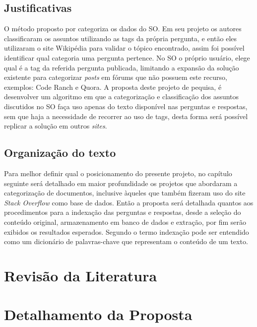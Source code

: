 \documentclass[10pt,a4paper,final]{article}
\begin{document}
    \subsection{Justificativas}

O método proposto por \cite{Arash2016} categoriza os dados do SO. Em seu projeto os autores classificaram os assuntos utilizando as tags da própria pergunta, e então eles utilizaram o site Wikipédia para validar o tópico encontrado, assim foi possível identificar qual categoria uma pergunta pertence. No SO o próprio usuário, elege qual é a tag da referida pergunta publicada, limitando a expansão da solução existente para categorizar \textit{posts} em fórums que não possuem este recurso, exemplos: Code Ranch e Quora.
\newline
\newline
A proposta deste projeto de pequisa, é desenvolver um algoritmo em que a categorização e classificação dos assuntos discutidos no SO faça uso apenas do texto disponível nas perguntas e respostas, sem que haja a necessidade de recorrer ao uso de tags, desta forma será possível replicar a solução em outros \textit{sites}.

   \subsection{Organização do texto}

Para melhor definir qual o posicionamento do presente projeto, no capítulo seguinte será detalhado em maior profundidade os projetos que abordaram a categorização de documentos, inclusive àqueles que também fizeram uso do site \textit{Stack Overflow} como base de dados. Então a proposta será detalhada quantos aos procedimentos para a indexação das perguntas e respostas, desde a seleção do conteúdo original, armazenamento em banco de dados e extração, por fim serão exibidos os resultados esperados. Segundo \cite{Kaleta2014} o termo indexação pode ser entendido como um dicionário de palavras-chave que representam o conteúdo de um texto.	

 \section{Revisão da Literatura}
   


 \section{Detalhamento da Proposta}
\end{document}

